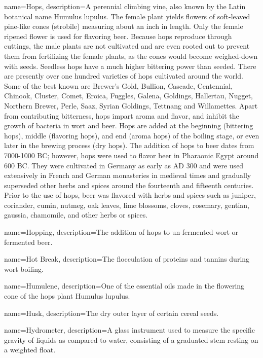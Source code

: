 {
  name={Hops},
  description={A perennial climbing vine, also known by the Latin botanical name Humulus lupulus. The female plant yields flowers of soft-leaved pine-like cones (strobile) measuring about an inch in length. Only the female ripened flower is used for flavoring beer. Because hops reproduce through cuttings, the male plants are not cultivated and are even rooted out to prevent them from fertilizing the female plants, as the cones would become weighed-down with seeds. Seedless hops have a much higher bittering power than seeded. There are presently over one hundred varieties of hops cultivated around the world. Some of the best known are Brewer’s Gold, Bullion, Cascade, Centennial, Chinook, Cluster, Comet, Eroica, Fuggles, Galena, Goldings, Hallertau, Nugget, Northern Brewer, Perle, Saaz, Syrian Goldings, Tettnang and Willamettes. Apart from contributing bitterness, hops impart aroma and flavor, and inhibit the growth of bacteria in wort and beer. Hops are added at the beginning (bittering hops), middle (flavoring hops), and end (aroma hops) of the boiling stage, or even later in the brewing process (dry hops). The addition of hops to beer dates from 7000-1000 BC; however, hops were used to flavor beer in Pharaonic Egypt around 600 BC. They were cultivated in Germany as early as AD 300 and were used extensively in French and German monasteries in medieval times and gradually superseded other herbs and spices around the fourteenth and fifteenth centuries. Prior to the use of hops, beer was flavored with herbs and spices such as juniper, coriander, cumin, nutmeg, oak leaves, lime blossoms, cloves, rosemary, gentian, gaussia, chamomile, and other herbs or spices.}
  }

{
  name={Hopping},
  description={The addition of hops to un-fermented wort or fermented beer.}
  }

{
  name={Hot Break},
  description={The flocculation of proteins and tannins during wort boiling.}
  }

{
  name={Humulene},
  description={One of the essential oils made in the flowering cone of the hops plant Humulus lupulus.}
  }

{
  name=Husk,
  description={The dry outer layer of certain cereal seeds.}
  }

{
  name={Hydrometer},
  description={A glass instrument used to measure the specific gravity of liquids as compared to water, consisting of a graduated stem resting on a weighted float.}
  }

